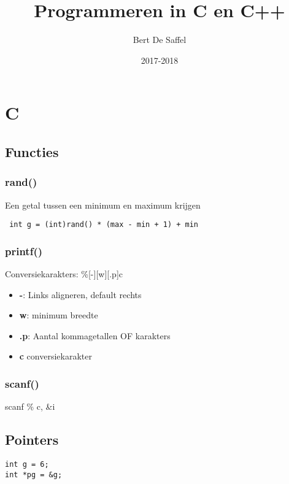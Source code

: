 \documentclass[12pt]{report}
\title{Programmeren in C en C++}
\author{Bert De Saffel}
\date{2017-2018}
\newcommand{\important}[1] {\textbf{\color{orange}#1}}
\begin{document}
\maketitle
\tableofcontents

\part{C}
\chapter{Functies}
\section{rand()}
Een getal tussen een minimum en maximum krijgen
\newline
\begin{lstlisting}
 int g = (int)rand() * (max - min + 1) + min
\end{lstlisting}




\section{printf()}
Conversiekarakters: \%[-][w][.p]c
\begin{itemize}
 \item \important{-}: Links aligneren, default rechts
 \item \important{w}: minimum breedte
 \item \important{.p}: Aantal kommagetallen OF karakters
 \item \important{c} conversiekarakter

\end{itemize}

\section{scanf()}
scanf \% c, \&i

\chapter{Pointers}

\begin{lstlisting}
int g = 6;
int *pg = &g;
\end{lstlisting}

\end{document}
